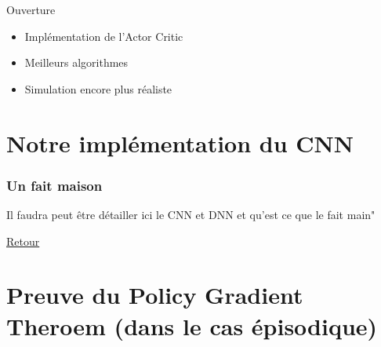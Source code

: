 \documentclass[8pt]{beamer}
\begin{document}
\begin{frame}{Ouverture}
  \begin{itemize}
  \item Implémentation de l'Actor Critic
  \item Meilleurs algorithmes
  \item Simulation encore plus réaliste
  \end{itemize}
\end{frame}


\appendix

\section*{Notre implémentation du CNN}

\begin{frame}[label=CNN]
  \frametitle{Un fait maison}
  \begin{center}
    Il faudra peut être détailler ici le CNN et DNN et qu'est ce que le fait main"
    \end{center}
  \hyperlink{retourCNN}{Retour}
\end{frame}

\section*{Preuve du Policy Gradient Theroem (dans le cas épisodique)}
\end{document}
